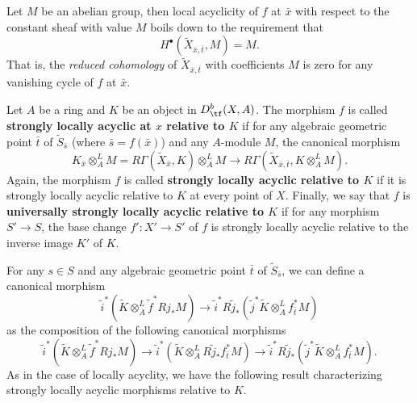 \begin{example}\label{scheme morphism locally acyclic relative to constant char}
Let $M$ be an abelian group, then local acyclicity of $f$ at $\bar{x}$ with respect to the constant sheaf with value $M$ boils down to the requirement that
\[H^\bullet(\widetilde{X}_{\bar{x},\bar{t}},M)=M.\]
That is, the \textit{reduced cohomology} of $\widetilde{X}_{\bar{x},\bar{t}}$ with coefficients $M$ is zero for any vanishing cycle of $f$ at $\bar{x}$.
\end{example}

Let $A$ be a ring and $K$ be an object in $D^b_{\tf}(X,A)$. The morphism $f$ is called \textbf{strongly locally acyclic at $x$ relative to $K$} if for any algebraic geometric point $\bar{t}$ of $\widetilde{S}_{\bar{s}}$ (where $\bar{s}=f(\bar{x})$) and any $A$-module $M$, the canonical morphism
\[K_{\bar{x}}\otimes_A^LM=R\Gamma(\widetilde{X}_{\bar{x}},K)\otimes_A^LM\to R\Gamma(\widetilde{X}_{\bar{x},\bar{t}},K\otimes_A^LM).\]
Again, the morphism $f$ is called \textbf{strongly locally acyclic relative to $K$} if it is strongly locally acyclic relative to $K$ at every point of $X$. Finally, we say that $f$ is \textbf{universally strongly locally acyclic relative to $K$} if for any morphism $S'\to S$, the base change $f':X'\to S'$ of $f$ is strongly locally acyclic relative to the inverse image $K'$ of $K$.\par

For any $s\in S$ and any algebraic geometric point $\bar{t}$ of $\widetilde{S}_{\bar{s}}$, we can define a canonical morphism
\[\tilde{i}^*(\widetilde{K}\otimes_A^L\tilde{f}^*Rj_*M)\to \tilde{i}^*R\tilde{j}_*(\tilde{j}^*\widetilde{K}\otimes_A^Lf_{\bar{t}}^*M)\]
as the composition of the following canonical morphisms
\[\tilde{i}^*(\widetilde{K}\otimes_A^L\tilde{f}^*Rj_*M)\to \tilde{i}^*(\widetilde{K}\otimes_A^LR\tilde{j}_*f_{\bar{t}}^*M)\to \tilde{i}^*R\tilde{j}_*(\tilde{j}^*\widetilde{K}\otimes_A^Lf_{\bar{t}}^*M).\]
As in the case of locally acyclity, we have the following result characterizing strongly locally acyclic morphisms relative to $K$.

